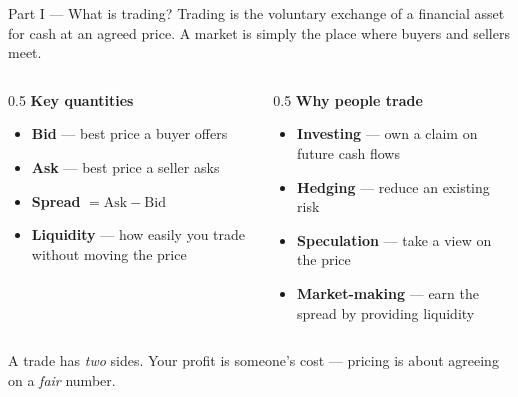\documentclass[11pt,aspectratio=169]{beamer}
\newcommand{\keybox}[1]{%
  \begin{beamercolorbox}[wd=\textwidth,sep=0.6em,rounded=true]{}%
    \colorbox{soft}{\parbox{\dimexpr\textwidth-1.4em}{\color{ink}#1}}%
  \end{beamercolorbox}}
\begin{document}
\begin{frame}{Part I — What is trading?}
  Trading is the voluntary exchange of a financial asset for cash at an
  agreed price. A \alert{market} is simply the place where buyers and
  sellers meet.
  \vspace{0.6em}
  \begin{columns}[T]
    \begin{column}{0.5\textwidth}
      \textbf{Key quantities}
      \begin{itemize}
        \item \textbf{Bid} — best price a buyer offers
        \item \textbf{Ask} — best price a seller asks
        \item \textbf{Spread} $=\text{Ask}-\text{Bid}$
        \item \textbf{Liquidity} — how easily you trade without moving the price
      \end{itemize}
    \end{column}
    \begin{column}{0.5\textwidth}
      \textbf{Why people trade}
      \begin{itemize}
        \item \textbf{Investing} — own a claim on future cash flows
        \item \textbf{Hedging} — reduce an existing risk
        \item \textbf{Speculation} — take a view on the price
        \item \textbf{Market-making} — earn the spread by providing liquidity
      \end{itemize}
    \end{column}
  \end{columns}
  \vfill
  \keybox{A trade has \emph{two} sides. Your profit is someone's cost — pricing is about agreeing on a \emph{fair} number.}
\end{frame}
\end{document}
